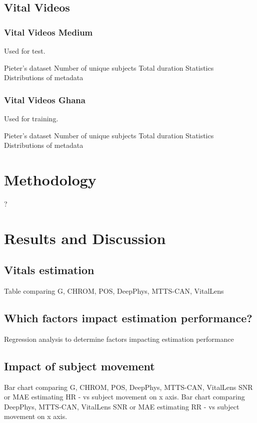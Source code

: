 \documentclass{article}
\begin{document}
\subsection{Vital Videos}

\subsubsection{Vital Videos Medium}

Used for test.

Pieter's dataset
Number of unique subjects
Total duration
Statistics
Distributions of metadata

\subsubsection{Vital Videos Ghana}

Used for training.

Pieter's dataset
Number of unique subjects
Total duration
Statistics
Distributions of metadata


\section{Methodology}
\label{others}

?

\section{Results and Discussion}

\subsection{Vitals estimation}

Table comparing G, CHROM, POS, DeepPhys, MTTS-CAN, VitalLens

\subsection{Which factors impact estimation performance?}

Regression analysis to determine factors impacting estimation performance

\subsection{Impact of subject movement}

Bar chart comparing G, CHROM, POS, DeepPhys, MTTS-CAN, VitalLens SNR or MAE estimating HR - vs subject movement on x axis.
Bar chart comparing DeepPhys, MTTS-CAN, VitalLens SNR or MAE estimating RR - vs subject movement on x axis.
\end{document}
